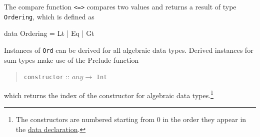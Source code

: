 The compare function \texttt{<=>} compares two values and returns a result of type \texttt{Ordering}, which is defined as
\begin{code}
    data Ordering = Lt | Eq | Gt
\end{code}

Instances of \texttt{Ord} can be derived for all algebraic data types. Derived instances for sum types make use of the Prelude function
\begin{quote}
\texttt{constructor} :: $any \rightarrow$ \texttt{Int}
\end{quote}
which returns the index of the constructor for algebraic data types.\footnote{The constructors are numbered starting from 0 in the order they appear in the \hyperref[datadcl]{data declaration}.}

